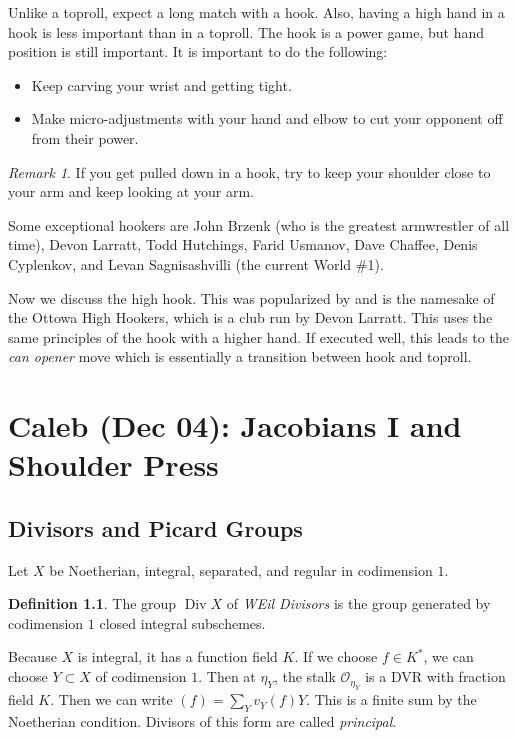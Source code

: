 \documentclass[leqno, openany]{memoir}
\theoremstyle{definition}
\newtheorem{defn}[thm]{Definition}
\theoremstyle{remark}
\newtheorem{rmk}[thm]{Remark}
\theoremstyle{plain}
\theoremstyle{definition}
\theoremstyle{remark}
\newcommand{\mc}[1]{\mathcal{#1}}
\begin{document}
Unlike a toproll, expect a long match with a hook. Also, having a high hand in
a hook is less important than in a toproll. The hook is a power game, but hand
position is still important. It is important to do the following:
\begin{itemize} \item Keep carving your wrist and getting tight.  \item Make
micro-adjustments with your hand and elbow to cut your opponent off from their
power.  \end{itemize}

\begin{rmk} If you get pulled down in a hook, try to keep your shoulder close
to your arm and keep looking at your arm.  \end{rmk}

Some exceptional hookers are John Brzenk (who is the greatest armwrestler of
all time), Devon Larratt, Todd Hutchings, Farid Usmanov, Dave Chaffee, Denis
Cyplenkov, and Levan Sagnisashvilli (the current World \#1).

Now we discuss the high hook. This was popularized by and is the namesake of
the Ottowa High Hookers, which is a club run by Devon Larratt. This uses the
same principles of the hook with a higher hand. If executed well, this leads to
the \textit{can opener} move which is essentially a transition between hook and
toproll. 

\chapter{Caleb (Dec 04): Jacobians I and Shoulder Press}%
\label{cha:caleb_dec_04_jacobians_i_and_shoulder_press}

\section{Divisors and Picard Groups}%

Let $X$ be Noetherian, integral, separated, and regular in codimension $1$.

\begin{defn} The group $\operatorname{Div} X$ of \textit{WEil Divisors} is the
group generated by codimension $1$ closed integral subschemes.  \end{defn}

Because $X$ is integral, it has a function field $K$. If we choose $f \in K^*$,
we can choose $Y \subset X$ of codimension $1$. Then at $\eta_Y$, the stalk
$\mc{O}_{\eta_Y}$ is a DVR with fraction field $K$. Then we can write $(f) =
\sum_Y v_Y(f) Y$. This is a finite sum by the Noetherian condition. Divisors of
this form are called \textit{principal}. 
\end{document}
